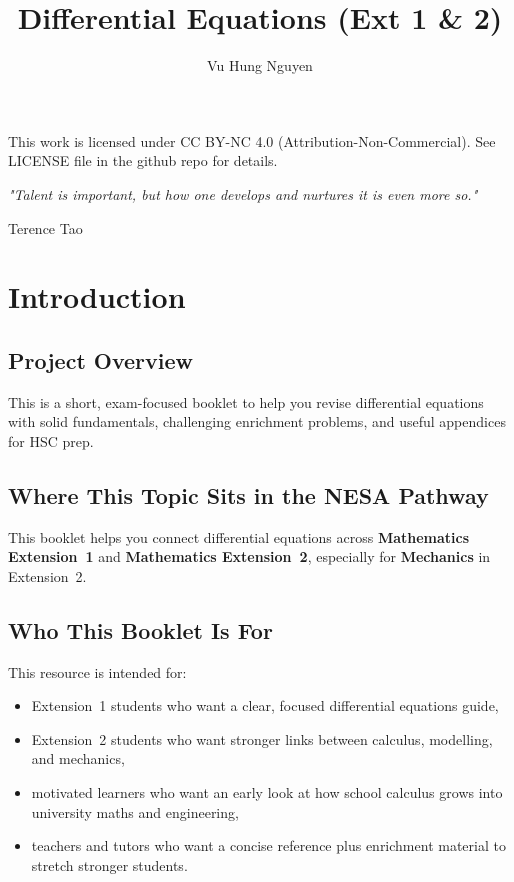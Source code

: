 \documentclass[12pt]{article}
\author{Vu Hung Nguyen}
\title{Differential Equations (Ext 1 \& 2)}
\date{}
\begin{document}


\newpage


\begingroup\small\noindent This work is licensed under CC BY-NC 4.0 (Attribution-Non-Commercial). See LICENSE file in the github repo for details.\par\endgroup

\newpage
\thispagestyle{empty}
\vspace*{\fill}
\begin{center}
\itshape
"Talent is important, but how one develops and nurtures it is even more so."

\vspace{1em}
\normalfont Terence Tao
\end{center}
\vspace*{\fill}

\newpage
\tableofcontents
\newpage

\section{Introduction}

\subsection{Project Overview}

This is a short, exam-focused booklet to help you revise differential equations with solid fundamentals, challenging enrichment problems, and useful appendices for HSC prep.

\subsection{Where This Topic Sits in the NESA Pathway}
This booklet helps you connect differential equations across \textbf{Mathematics Extension~1} and \textbf{Mathematics Extension~2}, especially for \textbf{Mechanics} in Extension~2.

\subsection{Who This Booklet Is For}
This resource is intended for:
\begin{itemize}[leftmargin=*]
  \item Extension~1 students who want a clear, focused differential equations guide,
  \item Extension~2 students who want stronger links between calculus, modelling, and mechanics,
  \item motivated learners who want an early look at how school calculus grows into university maths and engineering,
  \item teachers and tutors who want a concise reference plus enrichment material to stretch stronger students.
\end{itemize}
\end{document}
